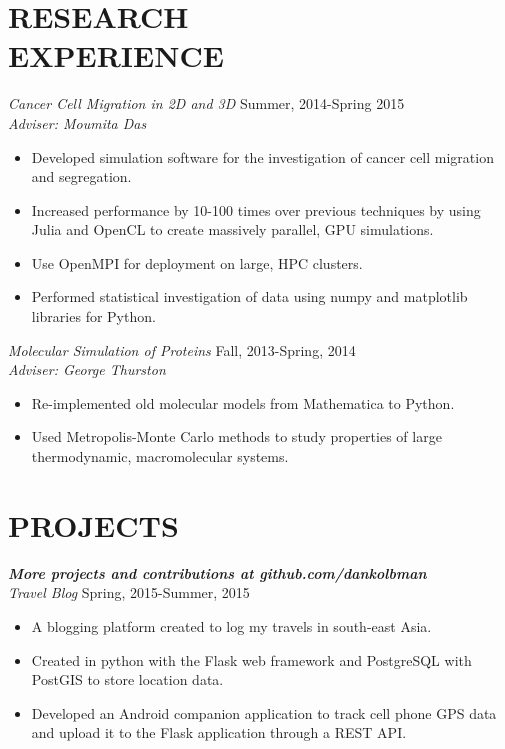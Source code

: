 \documentclass[margin]{res}
\begin{document}
\begin{resume}

\section{RESEARCH\\EXPERIENCE}
  {\sl Cancer Cell Migration in 2D and 3D} \hfill  Summer, 2014-Spring 2015\\
  {\sl Adviser: Moumita Das}\\                
  \begin{itemize}
    \item Developed simulation software for the investigation of cancer cell migration
      and segregation.
    \item Increased performance by 10-100 times over previous techniques by using
      Julia and OpenCL to create massively parallel, GPU simulations.
    \item Use OpenMPI for deployment on large, HPC clusters.
    \item Performed statistical investigation of data using numpy and matplotlib
      libraries for Python.
  \end{itemize}

  {\sl Molecular Simulation of Proteins} \hfill   Fall, 2013-Spring, 2014 \\
  {\sl Adviser: George Thurston}\\                
  \begin{itemize}
    \item Re-implemented old molecular models from Mathematica to Python.
    \item Used Metropolis-Monte Carlo methods to study 
      properties of large thermodynamic, macromolecular systems.
  \end{itemize}
     


\section{PROJECTS}
  {\sl \textbf{More projects and contributions at github.com/dankolbman}}\\
  {\sl Travel Blog} \hfill            Spring, 2015-Summer, 2015 \\
  \begin{itemize}
    \item A blogging platform created to log my travels in south-east Asia.
    \item Created in python with the Flask web framework and PostgreSQL with
      PostGIS to store location data.
    \item Developed an Android companion application to track cell phone GPS data
      and upload it to the Flask application through a REST API.
  \end{itemize}
      

\end{resume}
\end{document}

